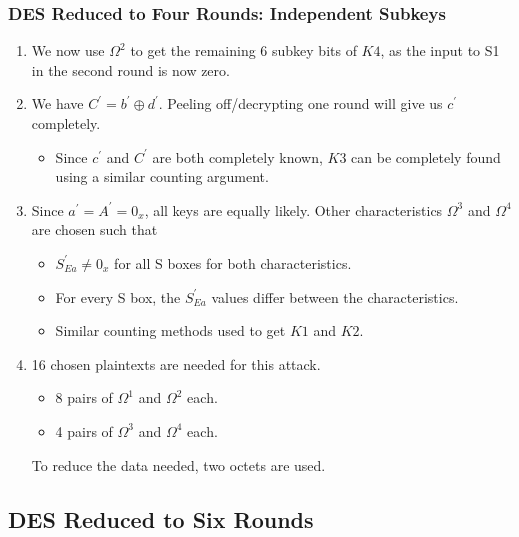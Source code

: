 \documentclass{beamer}
\begin{document}
    \begin{frame}
        \frametitle{DES Reduced to Four Rounds: Independent Subkeys}
        \begin{enumerate}
            \item<1-> We now use \(\Omega^2\) to get the remaining 6 subkey bits
            of \(K4\), as the input to S1 in the second round is now zero.
            \item<2-> We have \(C^\prime = b^\prime \oplus d^\prime\). Peeling
            off/decrypting one round will give us \(c^\prime\) completely.
            \begin{itemize}
                \item<3-> Since \(c^\prime\) and \(C^\prime\) are both
                completely known, \(K3\) can be completely found using a similar
                counting argument.
            \end{itemize}
            \item<4-> Since \(a^\prime = A^\prime = 0_x\), all keys are equally
            likely. Other characteristics \(\Omega^3\) and \(\Omega^4\) are
            chosen such that
            \begin{itemize}
                \item \(S_{Ea}^\prime \neq 0_x\) for all S boxes for both
                characteristics.
                \item For every S box, the \(S_{Ea}^\prime\) values differ
                between the characteristics.
                \item Similar counting methods used to get \(K1\) and \(K2\).
            \end{itemize}
            \item<5-> 16 chosen plaintexts are needed for this attack.
            \begin{itemize}
                \item 8 pairs of \(\Omega^1\) and \(\Omega^2\) each.
                \item 4 pairs of \(\Omega^3\) and \(\Omega^4\) each.
            \end{itemize}
            To reduce the data needed, two octets are used.
        \end{enumerate}
    \end{frame}

    \subsection{DES Reduced to Six Rounds}
    \label{subsec:des-6rd}
\end{document}
